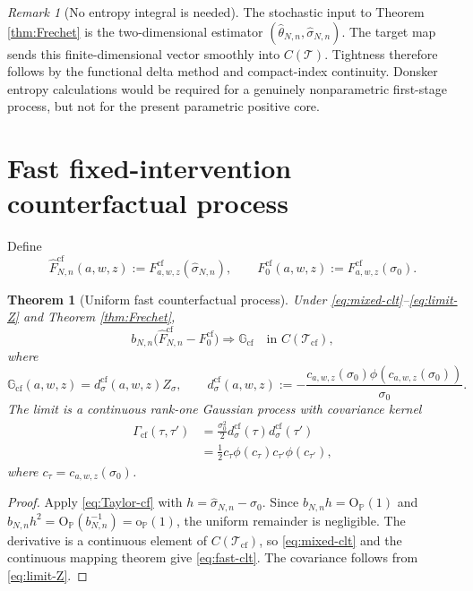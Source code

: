\documentclass[11pt]{article}
\newtheorem{theorem}[assumption]{Theorem}
\theoremstyle{remark}
\newtheorem{remark}[assumption]{Remark}
\newcommand{\Pp}{\mathbb P}
\newcommand{\op}{\mathrm{o}_{\Pp}}
\newcommand{\Op}{\mathrm{O}_{\Pp}}
\newcommand{\cf}{\mathrm{cf}}
\newcommand{\cT}{\mathcal T}
\newcommand{\ph}{\phi}
\newcommand{\bn}{b_{N,n}}
\newcommand{\thetahat}{\widehat\theta_{N,n}}
\newcommand{\sigmahat}{\widehat\sigma_{N,n}}
\begin{document}
\begin{remark}[No entropy integral is needed]\label{rem:no-entropy}
The stochastic input to Theorem \ref{thm:Frechet} is the two-dimensional estimator $(\thetahat,\sigmahat)$.  The target map sends this finite-dimensional vector smoothly into $C(\cT)$.  Tightness therefore follows by the functional delta method and compact-index continuity.  Donsker entropy calculations would be required for a genuinely nonparametric first-stage process, but not for the present parametric positive core.
\end{remark}

\section{Fast fixed-intervention counterfactual process}

Define
\[
 \widehat F^{\cf}_{N,n}(a,w,z)
 :=F^{\cf}_{a,w,z}(\sigmahat),
 \qquad
 F^{\cf}_0(a,w,z)
 :=F^{\cf}_{a,w,z}(\sigma_0).
\]

\begin{theorem}[Uniform fast counterfactual process]\label{thm:fast-cf}
Under \eqref{eq:mixed-clt}--\eqref{eq:limit-Z} and Theorem \ref{thm:Frechet},
\begin{equation}\label{eq:fast-clt}
 \bn\big(\widehat F^{\cf}_{N,n}-F^{\cf}_0\big)
 \Rightarrow \mathbb G_{\cf}
 \quad\text{in }C(\cT_{\cf}),
\end{equation}
where
\begin{equation}\label{eq:Gcf}
 \mathbb G_{\cf}(a,w,z)
 =d_\sigma^{\cf}(a,w,z)Z_\sigma,
 \qquad
 d_\sigma^{\cf}(a,w,z)
 :=-\frac{c_{a,w,z}(\sigma_0)\ph(c_{a,w,z}(\sigma_0))}{\sigma_0}.
\end{equation}
The limit is a continuous rank-one Gaussian process with covariance kernel
\begin{align}
 \Gamma_{\cf}(\tau,\tau')
 &=\frac{\sigma_0^2}{2}
 d_\sigma^{\cf}(\tau)d_\sigma^{\cf}(\tau')\label{eq:Gamma-cf}\\
 &=\frac12
 c_\tau\ph(c_\tau)c_{\tau'}\ph(c_{\tau'}),\nonumber
\end{align}
where $c_\tau=c_{a,w,z}(\sigma_0)$.
\end{theorem}

\begin{proof}
Apply \eqref{eq:Taylor-cf} with $h=\sigmahat-\sigma_0$.  Since $\bn h=\Op(1)$ and $\bn h^2=\Op(\bn^{-1})=\op(1)$, the uniform remainder is negligible.  The derivative is a continuous element of $C(\cT_{\cf})$, so \eqref{eq:mixed-clt} and the continuous mapping theorem give \eqref{eq:fast-clt}.  The covariance follows from \eqref{eq:limit-Z}.
\end{proof}
\end{document}
